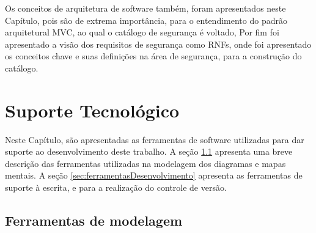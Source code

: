 Os conceitos de arquitetura de software também, foram apresentados neste Capítulo, pois são de extrema importância, para o entendimento do padrão arquitetural MVC, ao qual o catálogo de segurança é voltado, Por fim foi apresentado a visão dos requisitos de segurança como RNFs, onde foi apresentado os conceitos chave e suas definições na área de segurança, para a construção do catálogo. 



\chapter{Suporte Tecnológico}
\label{chap:suporteTecnologico}

Neste Capítulo, são apresentadas as ferramentas de software utilizadas para dar suporte ao desenvolvimento deste trabalho. A seção \ref{sec:ferramentasModelagem} apresenta uma breve descrição das ferramentas utilizadas na modelagem dos diagramas e mapas mentais. A seção \ref{sec:ferramentasDesenvolvimento} apresenta as ferramentas de suporte à escrita, e para a realização do controle de versão. 

\section{Ferramentas de modelagem}
\label{sec:ferramentasModelagem}

